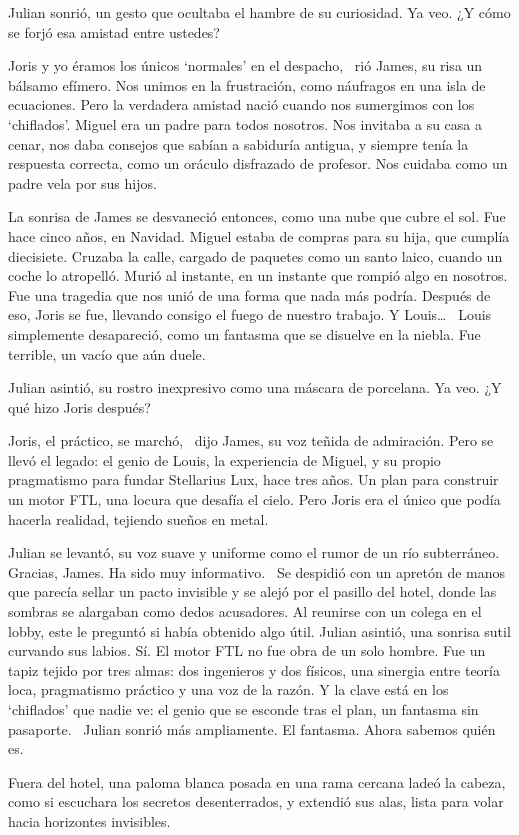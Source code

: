 Julian sonrió, un gesto que ocultaba el hambre de su curiosidad. \glqq Ya veo. ¿Y cómo se forjó esa amistad entre ustedes?\grqq

\glqq Joris y yo éramos los únicos `normales' en el despacho,\grqq~ rió James, su risa un bálsamo efímero. \glqq Nos unimos en la frustración, como náufragos en una isla de ecuaciones. Pero la verdadera amistad nació cuando nos sumergimos con los `chiflados'. Miguel era un padre para todos nosotros. Nos invitaba a su casa a cenar, nos daba consejos que sabían a sabiduría antigua, y siempre tenía la respuesta correcta, como un oráculo disfrazado de profesor. Nos cuidaba como un padre vela por sus hijos.\grqq

La sonrisa de James se desvaneció entonces, como una nube que cubre el sol. \glqq Fue hace cinco años, en Navidad. Miguel estaba de compras para su hija, que cumplía diecisiete. Cruzaba la calle, cargado de paquetes como un santo laico, cuando un coche lo atropelló. Murió al instante, en un instante que rompió algo en nosotros. Fue una tragedia que nos unió de una forma que nada más podría. Después de eso, Joris se fue, llevando consigo el fuego de nuestro trabajo. Y Louis\ldots~ Louis simplemente desapareció, como un fantasma que se disuelve en la niebla. Fue terrible, un vacío que aún duele.\grqq

Julian asintió, su rostro inexpresivo como una máscara de porcelana. \glqq Ya veo. ¿Y qué hizo Joris después?\grqq

\glqq Joris, el práctico, se marchó,\grqq~ dijo James, su voz teñida de admiración. \glqq Pero se llevó el legado: el genio de Louis, la experiencia de Miguel, y su propio pragmatismo para fundar Stellarius Lux, hace tres años. Un plan para construir un motor FTL, una locura que desafía el cielo. Pero Joris era el único que podía hacerla realidad, tejiendo sueños en metal.\grqq

Julian se levantó, su voz suave y uniforme como el rumor de un río subterráneo. \glqq Gracias, James. Ha sido muy informativo.\grqq~ Se despidió con un apretón de manos que parecía sellar un pacto invisible y se alejó por el pasillo del hotel, donde las sombras se alargaban como dedos acusadores. Al reunirse con un colega en el lobby, este le preguntó si había obtenido algo útil. Julian asintió, una sonrisa sutil curvando sus labios. \glqq Sí. El motor FTL no fue obra de un solo hombre. Fue un tapiz tejido por tres almas: dos ingenieros y dos físicos, una sinergia entre teoría loca, pragmatismo práctico y una voz de la razón. Y la clave está en los `chiflados' que nadie ve: el genio que se esconde tras el plan, un fantasma sin pasaporte.\grqq~ Julian sonrió más ampliamente. \glqq El fantasma. Ahora sabemos quién es.\grqq

Fuera del hotel, una paloma blanca posada en una rama cercana ladeó la cabeza, como si escuchara los secretos desenterrados, y extendió sus alas, lista para volar hacia horizontes invisibles.
